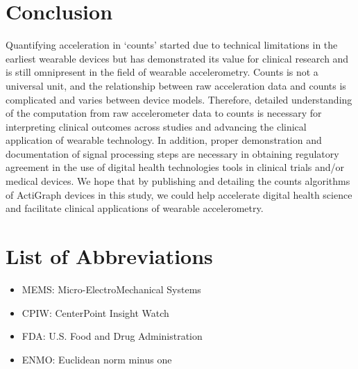 \documentclass{bmcart}
\begin{document}
\section*{Conclusion}
Quantifying acceleration in ‘counts’ started due to technical limitations in
the earliest wearable devices but has demonstrated its value for clinical
research and is still omnipresent in the field of wearable accelerometry.
Counts is not a universal unit, and the relationship between raw acceleration
data and counts is complicated and varies between device models. Therefore,
detailed understanding of the computation from raw accelerometer data to counts
is necessary for interpreting clinical outcomes across studies and advancing
the clinical application of wearable technology. In addition, proper
demonstration and documentation of signal processing steps are necessary in
obtaining regulatory agreement in the use of digital health technologies tools
in clinical trials and/or medical devices. We hope that by publishing and
detailing the counts algorithms of ActiGraph devices in this study, we could
help accelerate digital health science and facilitate clinical applications of
wearable accelerometry.

\section*{List of Abbreviations}
\begin{itemize}
\item{MEMS: Micro-ElectroMechanical  Systems}
\item{CPIW: CenterPoint Insight Watch}
\item{FDA: U.S. Food and Drug Administration}
\item{ENMO: Euclidean norm minus one}
\end{itemize}
\end{document}
